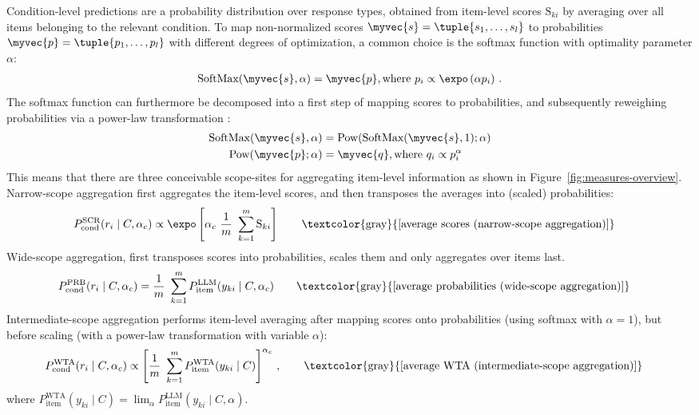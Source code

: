 \documentclass[fleqn]{article}
\begin{document}
Condition-level predictions are a probability distribution over response types, obtained from item-level scores $\text{S}_{ki}$ by averaging over all items belonging to the relevant condition.
To map non-normalized scores $\myvec{s} = \tuple{s_{1}, \dots, s_{l}}$ to probabilities $\myvec{p} = \tuple{p_{1}, \dots, p_{l}}$ with different degrees of optimization, a common choice is the softmax function with optimality parameter $\alpha$:
%
\begin{align*}
 \text{SoftMax}(\myvec{s}, \alpha) = \myvec{p}, \text{where } p_{i} \propto \expo \left (\alpha p_{i} \right )\,.
\end{align*}
%
The softmax function can furthermore be decomposed into a first step of mapping scores to probabilities, and subsequently reweighing probabilities via a power-law transformation \citep[c.f.,][]{FrankeDegen2023:The-softmax-fun}:
%
\begin{align*}
  \text{SoftMax}(\myvec{s}, \alpha) & = \text{Pow}( \text{SoftMax}(\myvec{s}, 1) ; \alpha) \\
  \text{Pow}(\myvec{p} ; \alpha) & = \myvec{q}, \text{where } q_{i} \propto p_{i}^{\alpha}
\end{align*}
%
This means that there are three conceivable scope-sites for aggregating item-level information as shown in Figure~\ref{fig:measures-overview}.
Narrow-scope aggregation first aggregates the item-level scores, and then transposes the averages into (scaled) probabilities:
%
\begin{align*}
  & P_{\text{cond}}^{\text{SCR}}(r_{i} \mid C, \alpha_{c})
    \propto \expo \left [  \alpha_{c} \ \frac{1}{m} \ \sum_{k=1}^{m} \text{S}_{ki}  \right ]
    \tag*{\textcolor{gray}{[average scores (narrow-scope aggregation)]}}
\end{align*}
%
Wide-scope aggregation, first transposes scores into probabilities, scales them and only aggregates over items last.
\begin{align*}
  & P_{\text{cond}}^{\text{PRB}}(r_{i} \mid C, \alpha_{c})
    = \frac{1}{m} \ \sum_{k=1}^{m} P_{\text{item}}^{\text{LLM}}(y_{ki} \mid C, \alpha_{c})
    \tag*{\textcolor{gray}{[average probabilities (wide-scope aggregation)]}}
\end{align*}
%
Intermediate-scope aggregation performs item-level averaging after mapping scores onto probabilities (using softmax with $\alpha=1$), but before scaling (with a power-law transformation with variable $\alpha$):
\begin{align*}
  & P_{\text{cond}}^{\text{WTA}}(r_{i} \mid C, \alpha_{c})
    \propto  \left [ \frac{1}{m} \ \sum_{k=1}^{m} P_{\text{item}}^{\text{WTA}}(y_{ki} \mid C) \right ]^{\alpha_{c}}\,,
    \tag*{\textcolor{gray}{[average WTA (intermediate-scope aggregation)]}}
\end{align*}
where $P_{\text{item}}^{\text{WTA}}(y_{ki} \mid C) = \lim_{\alpha} P_{\text{item}}^{\text{LLM}}(y_{ki} \mid C, \alpha)$.
\bigskip
\end{document}
